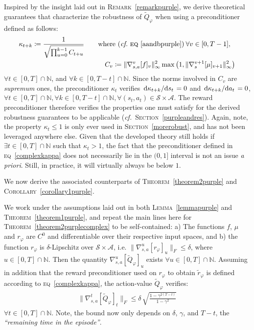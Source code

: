 Inspired by the insight laid out in \textsc{Remark}~\ref{remarkpurple},
we derive theoretical guarantees that characterize the robustness of $\widetilde{Q}_\varphi$
when using a preconditioner defined as follows:
\begin{align}
\kappa_{t+k} \coloneqq
\frac{1}{\sqrt{\prod_{u=0}^{k-1} C_{t+u}}}
\qquad &\text{where (\textit{cf.}~\textsc{eq}~\ref{aandbpurple})} \:
\forall v \in [0, T-1], \nonumber \\
&\quad C_v \coloneqq \lVert\nabla_{s,a}^v[f]_v\rVert _\infty^2
\max \big(1, \lVert\nabla_s^{v+1}[\mu]_{v+1}\rVert _\infty^2\big)
\label{complexkappa}
\end{align}
$\forall t \in [0, T] \cap \mathbb{N}$, and
$\forall k \in [0, T-t] \cap \mathbb{N}$.
Since the norms involved in $C_v$ are \emph{supremum} ones,
the preconditioner $\kappa_t$ verifies
$\dv*{\kappa_{t+k}}{s_t} = 0$ and
$\dv*{\kappa_{t+k}}{a_t} = 0$,
$\forall t \in [0, T] \cap \mathbb{N},
\forall k \in [0, T-t] \cap \mathbb{N},
\forall (s_t, a_t) \in \mathcal{S} \times \mathcal{A}$.
The reward preconditioner therefore verifies the properties
one must satisfy for the derived robustness guarantees to be applicable
(\textit{cf.}~\textsc{Section}~\ref{purpleandres}).
Again, note, the property $\kappa_t \leq 1$ is only ever used in \textsc{Section}~\ref{morerobust},
and has not been leveraged anywhere else.
Given that the developed theory still holds if $\exists t \in [0, T] \cap \mathbb{N}$ such that $\kappa_t > 1$,
the fact that the preconditioner defined in \textsc{eq}~\ref{complexkappa} does not necessarily lie in
the $(0,1]$ interval is not an issue \textit{a priori}.
Still, in practice,
it will virtually always be below $1$.

We now derive the associated counterparts of
\textsc{Theorem}~\ref{theorem2purple} and \textsc{Corollary}~\ref{corollary1purple}.

\begin{theorem}
\label{theorem2purplecomplex}
We work under the assumptions laid out in
both \textsc{Lemma}~\ref{lemmapurple} and \textsc{Theorem}~\ref{theorem1purple}, and repeat
the main lines here
for \textsc{Theorem}~\ref{theorem2purplecomplex} to be self-contained:
a) The functions $f$, $\mu$ and $r_\varphi$ are $C^0$ and differentiable
over their respective input spaces,
and b) the function $r_\varphi$ is $\delta$-Lipschitz
over $\mathcal{S} \times \mathcal{A}$, i.e.
$\lVert \nabla_{s,a}^u[r_\varphi]_u \rVert _F \leq \delta$,
where $u \in [0, T] \cap \mathbb{N}$.
Then the quantity $\nabla_{s,a}^u[\widetilde{Q}_\varphi]_u$ exists
$\forall u \in [0, T] \cap \mathbb{N}$.
Assuming in addition that the reward preconditioner used on $r_\varphi$ to obtain $\tilde{r}_\varphi$
is defined according to \textsc{eq}~\ref{complexkappa},
the action-value $\widetilde{Q}_\varphi$ verifies:
\begin{align}
\lVert \nabla_{s,a}^t[\widetilde{Q}_\varphi]_t \rVert _F
\leq
\delta \, \sqrt{\frac{1 - \gamma^{2(T - t)}}{1 - \gamma^2}}
\end{align}
$\forall t \in [0, T] \cap \mathbb{N}$.
Note, the bound now only depends on $\delta$, $\gamma$, and $T-t$, the \textit{``remaining time in the episode''}.
\end{theorem}

